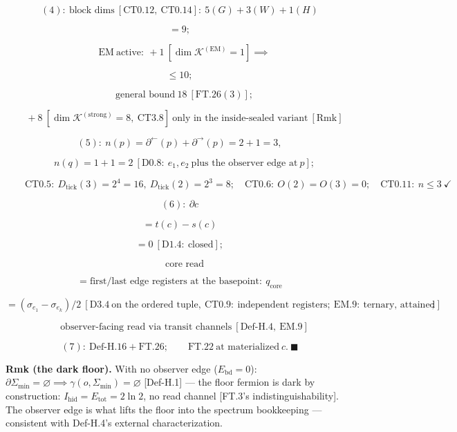 \begin{theorem}
\[
(4):\ \text{block dims}\ [\mathrm{CT0.12},\ \mathrm{CT0.14}]:\ 5(G)+3(W)+1(H)
\]

\[
= 9;
\]

\[
\quad\mathrm{EM}\ \text{active}:\ +1\ [\dim\mathcal K^{(\mathrm{EM})}=1]\implies
\]

\[
\le 10;
\]

\[
\quad\text{general bound}\ 18\ [\mathrm{FT.26}(3)];
\]

\[
\quad +8\ [\dim\mathcal K^{(\mathrm{strong})}=8,\ \mathrm{CT3.8}]\ \text{only in the inside-sealed variant}\ [\mathrm{Rmk}]
\]

\[
(5):\ n(p)=\partial^\leftarrow(p)+\partial^\rightarrow(p)=2{+}1=3,
\]

\[
\quad n(q)=1{+}1=2\ [\mathrm{D0.8}:\ e_1,e_2\ \text{plus the observer edge at}\ p];
\]

\[
\qquad \mathrm{CT0.5}:\ D_{\mathrm{tick}}(3)=2^{4}=16,\ D_{\mathrm{tick}}(2)=2^{3}=8;\quad\mathrm{CT0.6}:\ O(2)=O(3)=0;\quad\mathrm{CT0.11}:\ n\le3\ \checkmark
\]

\[
(6):\ \partial c
\]

\[
= t(c)-s(c)
\]

\[
= 0\ [\mathrm{D1.4}:\ \text{closed}];
\]

\[
\quad\text{core read}
\]

\[
= \text{first/last edge registers at the basepoint}:\ q_{\mathrm{core}}
\]

\[
= (\sigma_{e_1}-\sigma_{e_k})/2\ [\mathrm{D3.4}\ \text{on the ordered tuple},\ \mathrm{CT0.9}:\ \text{independent registers};\ \mathrm{EM.9}:\ \text{ternary, attained}];
\]

\[
\quad\text{observer-facing read via transit channels}\ [\mathrm{Def\text{-}H.4},\ \mathrm{EM.9}]
\]

\[
(7):\ \mathrm{Def\text{-}H.16}+\mathrm{FT.26};\qquad\mathrm{FT.22}\ \text{at materialized}\ c.\ \blacksquare
\]

\textbf{Rmk (the dark floor).} With no observer edge ($E_{\mathrm{bd}}=0$): $\partial\Sigma_{\min}=\varnothing\implies\gamma(o,\Sigma_{\min})=\varnothing$ [Def-H.1] — the floor fermion is dark by construction: $I_{\mathrm{hid}}=E_{\mathrm{tot}}=2\ln2$, no read channel [FT.3's indistinguishability]. The observer edge is what lifts the floor into the spectrum bookkeeping — consistent with Def-H.4's external characterization.


\end{theorem}
